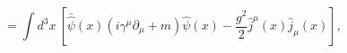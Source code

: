 \begin{equation}
=\int d^{3}x ~[\bar {\hat\psi}(x)(i\gamma^{\mu}\partial_{\mu}+m)\hat \psi(x)-\frac{g^{2}}{2}\hat j^{\mu}(x)\hat j_{\mu}(x)],
\label{thr}
\end{equation}

